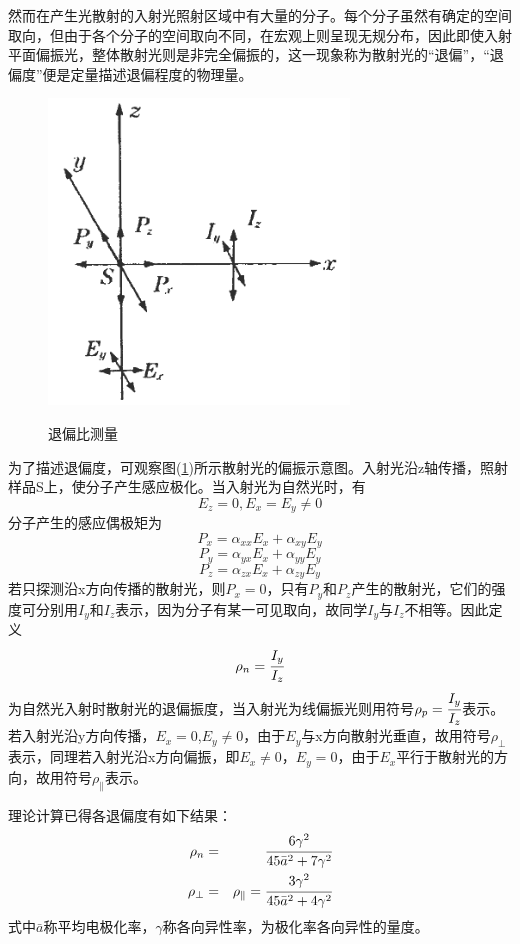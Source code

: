 \documentclass[a4paper]{article}
\begin{document}
然而在产生光散射的入射光照射区域中有大量的分子。每个分子虽然有确定的空间取向，但由于各个分子的空间取向不同，在宏观上则呈现无规分布，因此即使入射平面偏振光，整体散射光则是非完全偏振的，这一现象称为散射光的“退偏”，“退偏度”便是定量描述退偏程度的物理量。
\begin{figure}[!h]
\centering
\includegraphics[width=8cm]{fig/2.png}\\
\caption{退偏比测量}\label{fig2}
\end{figure}
为了描述退偏度，可观察图(\ref{fig2})所示散射光的偏振示意图。入射光沿z轴传播，照射样品S上，使分子产生感应极化。当入射光为自然光时，有
$$E_z = 0,E_x = E_y \neq 0$$
分子产生的感应偶极矩为
$$P_x = \alpha_{xx}E_x+\alpha_{xy}E_y$$
$$P_y = \alpha_{yx}E_x+\alpha_{yy}E_y$$
$$P_z = \alpha_{zx}E_x+\alpha_{zy}E_y$$
若只探测沿x方向传播的散射光，则$P_x = 0$，只有$P_y$和$P_z$产生的散射光，它们的强度可分别用$I_y$和$I_z$表示，因为分子有某一可见取向，故同学$I_y$与$I_z$不相等。因此定义
\begin{equation}
\rho_n = \cfrac{I_y}{I_z}\label{eq8}
\end{equation}
为自然光入射时散射光的退偏振度，当入射光为线偏振光则用符号$\rho_p = \cfrac{I_y}{I_z}$表示。若入射光沿y方向传播，$E_x = 0$,$E_y \neq 0$，由于$E_y$与x方向散射光垂直，故用符号$\rho_{\perp}$表示，同理若入射光沿x方向偏振，即$E_x \neq 0$，$E_y = 0$，由于$E_x$平行于散射光的方向，故用符号$\rho_{\parallel}$表示。

理论计算已得各退偏度有如下结果：
\begin{eqnarray}
\rho_n &=& \cfrac{6\gamma^2}{45\bar{a}^2+7\gamma^2}\\\label{eq9}
\rho_{\perp} &=& \rho_{\parallel} = \cfrac{3\gamma^2}{45\bar{a}^2+4\gamma^2}\label{eq10}
\end{eqnarray}
式中$\bar{a}$称平均电极化率，$\gamma$称各向异性率，为极化率各向异性的量度。
\end{document}
